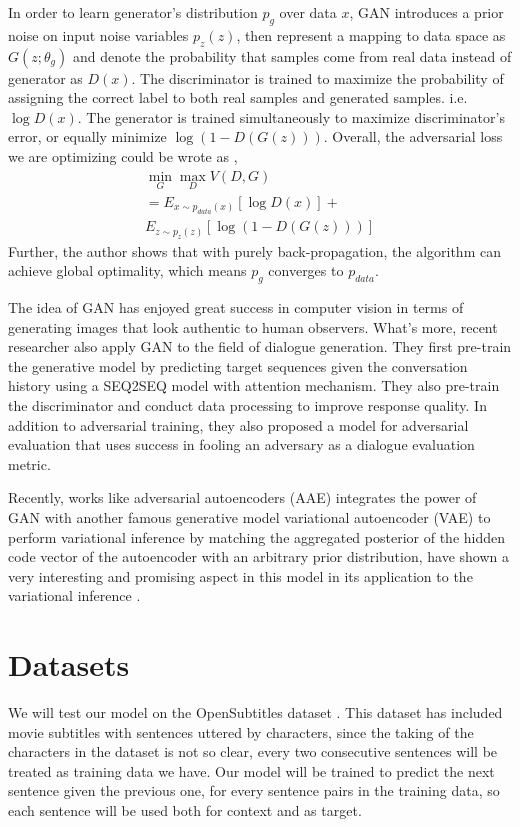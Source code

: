 \documentclass{article}
\begin{document}
In order to learn generator's distribution $p_g$ over data $x$, GAN introduces a prior noise on input noise variables $p_z(z)$, then represent a mapping to data space as $G(z;\theta_g)$ and denote the probability that samples come from real data instead of generator as $D(x)$. The discriminator is trained to maximize the probability of assigning the correct label to both real samples and generated samples. i.e. $\log D(x)$. The generator is trained simultaneously to maximize discriminator's error, or equally minimize $\log (1-D(G(z)))$. Overall, the adversarial loss we are optimizing could be wrote as ,
\begin{align*}
\min_G \max_D V(D,G) \\
= E_{x\sim p_{data}(x)}[\log D(x)] +\\
E_{z\sim p_z(z)}[\log (1-D(G(z)))]
\end{align*}
Further, the author shows that with purely back-propagation, the algorithm can achieve global optimality, which means $p_g$ converges to $p_{data}$.

The idea of GAN has enjoyed great success in computer vision in terms of generating images that look authentic to human observers. What's more, recent researcher also apply GAN to the field of dialogue generation. They first pre-train the generative model by predicting target sequences given the conversation history using a SEQ2SEQ model with attention mechanism. They also pre-train the discriminator and conduct data processing to improve response quality. In addition to adversarial training, they also proposed a model for adversarial evaluation that uses success in fooling an adversary as a dialogue evaluation metric.

Recently, works like adversarial autoencoders (AAE) \cite{aae} integrates the power of GAN with another famous generative model variational autoencoder (VAE) to perform variational inference by matching the aggregated posterior of the hidden code vector of the autoencoder with an arbitrary prior distribution, have shown a very interesting and promising aspect in this model in its application to the variational inference .

\section{Datasets}

We will test our model on the OpenSubtitles dataset \cite{opensubtitle}. This dataset has included movie subtitles with sentences uttered by characters, since the taking of the characters in the dataset is not so clear, every two consecutive sentences will be treated as training data we have. Our model will be trained to predict the next sentence given the  previous one, for every sentence pairs in the training data, so each sentence  will be used both for context and as target.
\end{document}
